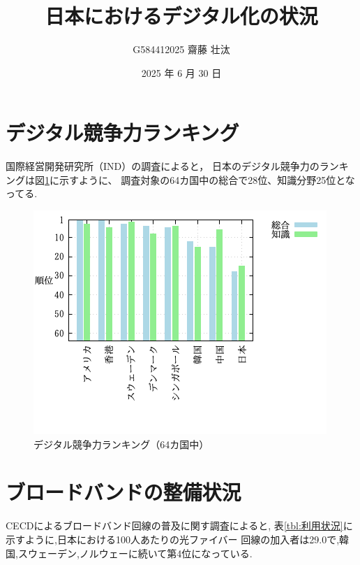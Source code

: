 \documentclass[a4paper,11pt,dvipdfmx]{ujarticle}
\title{日本におけるデジタル化の状況}
\author{G584412025 齋藤 壮汰}
\date{2025 年 6 月 30 日 }
\begin{document}
\maketitle %

\section{デジタル競争力ランキング}

国際経営開発研究所（IND）の調査\cite{imd}によると，
日本のデジタル競争力のランキングは図\ref{fig:保有率}に示すように、
調査対象の64カ国中の総合で28位、知識分野25位となってる.




\begin{figure}[htbp]
    \centering
    \includegraphics[width=0.7\linewidth]{fig31.png}
    \caption{デジタル競争力ランキング（64カ国中）}\label{fig:保有率}
\end{figure}

\section{ブロードバンドの整備状況}

CECDによるブロードバンド回線の普及に関す調査\cite{oecd}によると,
表\ref{tbl:利用状況}に示すように,日本における100人あたりの光ファイバー
回線の加入者は29.0で,韓国,スウェーデン,ノルウェーに続いて第4位になっている.
\end{document}

